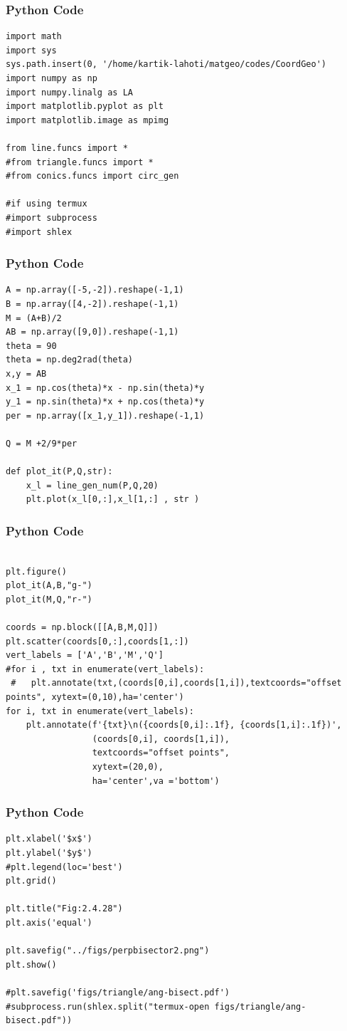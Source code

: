 \documentclass{beamer}
\begin{document}
\begin{frame}[fragile]
    \frametitle{Python Code}
    \begin{lstlisting}
import math
import sys 
sys.path.insert(0, '/home/kartik-lahoti/matgeo/codes/CoordGeo')
import numpy as np
import numpy.linalg as LA
import matplotlib.pyplot as plt
import matplotlib.image as mpimg

from line.funcs import *
#from triangle.funcs import *
#from conics.funcs import circ_gen

#if using termux
#import subprocess
#import shlex

\end{lstlisting}
\end{frame}

\begin{frame}[fragile]
    \frametitle{Python Code }
    \begin{lstlisting}
A = np.array([-5,-2]).reshape(-1,1)
B = np.array([4,-2]).reshape(-1,1)
M = (A+B)/2
AB = np.array([9,0]).reshape(-1,1)
theta = 90
theta = np.deg2rad(theta)
x,y = AB
x_1 = np.cos(theta)*x - np.sin(theta)*y
y_1 = np.sin(theta)*x + np.cos(theta)*y
per = np.array([x_1,y_1]).reshape(-1,1)

Q = M +2/9*per

def plot_it(P,Q,str):
    x_l = line_gen_num(P,Q,20)
    plt.plot(x_l[0,:],x_l[1,:] , str )
\end{lstlisting}
\end{frame}

\begin{frame}[fragile]
    \frametitle{Python Code }
    \begin{lstlisting}

plt.figure()
plot_it(A,B,"g-")
plot_it(M,Q,"r-")

coords = np.block([[A,B,M,Q]])
plt.scatter(coords[0,:],coords[1,:])
vert_labels = ['A','B','M','Q']
#for i , txt in enumerate(vert_labels):
 #   plt.annotate(txt,(coords[0,i],coords[1,i]),textcoords="offset points", xytext=(0,10),ha='center')
for i, txt in enumerate(vert_labels):
    plt.annotate(f'{txt}\n({coords[0,i]:.1f}, {coords[1,i]:.1f})',
                 (coords[0,i], coords[1,i]),
                 textcoords="offset points",
                 xytext=(20,0),
                 ha='center',va ='bottom')

\end{lstlisting}
\end{frame}

\begin{frame}[fragile]
    \frametitle{Python Code }
    \begin{lstlisting}
plt.xlabel('$x$')
plt.ylabel('$y$')
#plt.legend(loc='best')
plt.grid()

plt.title("Fig:2.4.28")
plt.axis('equal')

plt.savefig("../figs/perpbisector2.png")
plt.show()

#plt.savefig('figs/triangle/ang-bisect.pdf')
#subprocess.run(shlex.split("termux-open figs/triangle/ang-bisect.pdf"))
    \end{lstlisting}
\end{frame}
\end{document}
